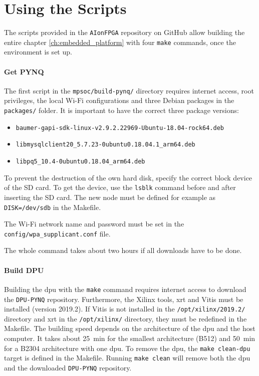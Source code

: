 \section{Using the Scripts}
\label{sec:embedded_platform:using_scripts}

The scripts provided in the \texttt{AIonFPGA} repository on GitHub allow building the entire chapter \ref{ch:embedded_platform} with four \texttt{make} commands, once the environment is set up.

\paragraph{Get PYNQ}
The first script in the \texttt{mpsoc/build-pynq/} directory requires internet access, root privileges, the local Wi-Fi configurations and three Debian packages in the \texttt{packages/} folder.
It is important to have the correct three package versions:
\begin{itemize}
  \item \texttt{baumer-gapi-sdk-linux-v2.9.2.22969-Ubuntu-18.04-rock64.deb}
  \item \texttt{libmysqlclient20\_5.7.23-0ubuntu0.18.04.1\_arm64.deb}
  \item \texttt{libpq5\_10.4-0ubuntu0.18.04\_arm64.deb}
\end{itemize}

To prevent the destruction of the own hard disk, specify the correct block device of the SD card.
To get the device, use the \texttt{lsblk} command before and after inserting the SD card.
The new node must be defined for example as \texttt{DISK=/dev/sdb} in the Makefile.

The Wi-Fi network name and password must be set in the \texttt{config/wpa\_supplicant.conf} file.

The whole command takes about two hours if all downloads have to be done.

\paragraph{Build DPU}
Building the \acrshort{dpu} with the \texttt{make} command requires internet access to download the \texttt{DPU-PYNQ} repository.
Furthermore, the Xilinx tools, \acrshort{xrt} and Vitis must be installed (version 2019.2).
If Vitis is not installed in the \texttt{/opt/xilinx/2019.2/} directory and \acrshort{xrt} in the \texttt{/opt/xilinx/} directory, they must be redefined in the Makefile.
The building speed depends on the architecture of the \acrshort{dpu} and the host computer.
It takes about \SI{25}{min} for the smallest architecture (B512) and \SI{50}{min} for a B2304 architecture with one \acrshort{dpu}.
To remove the \acrshort{dpu}, the \texttt{make clean-dpu} target is defined in the Makefile.
Running \texttt{make clean} will remove both the \acrshort{dpu} and the downloaded \texttt{DPU-PYNQ} repository.

